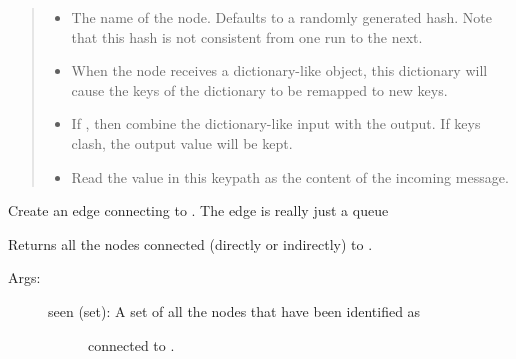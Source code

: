 \documentclass[letterpaper,10pt,english]{sphinxmanual}
\begin{document}
\begin{fulllineitems}
\begin{quote}
\begin{description}
\begin{itemize}
\item {} 
 \textendash{} The name of the node. Defaults to a randomly generated hash.
Note that this hash is not consistent from one run to the next.

\item {} 
 \textendash{} When the node receives a dictionary-like object,
this dictionary will cause the keys of the dictionary to be remapped
to new keys.

\item {} 
 \textendash{} If , then combine the dictionary-like input
with the output. If keys clash, the output value will be kept.

\item {} 
 \textendash{} Read the value in this keypath as the content
of the incoming message.

\end{itemize}

\end{description}\end{quote}

\begin{fulllineitems}
\label{\detokenize{api:nanostream.node.NanoNode.add_edge}}
Create an edge connecting  to . The edge
is really just a queue

\end{fulllineitems}


\begin{fulllineitems}
\label{\detokenize{api:nanostream.node.NanoNode.all_connected}}
Returns all the nodes connected (directly or indirectly) to .
\begin{description}
\item[{Args:}] \leavevmode\begin{description}
\item[{seen (set): A set of all the nodes that have been identified as}] \leavevmode
connected to .


\end{description}
\end{description}
\end{fulllineitems}
\end{fulllineitems}
\end{document}
